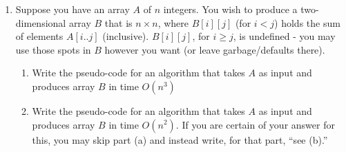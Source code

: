 \documentclass{article}
\begin{document}
\begin{enumerate}[label=\Large\textbf{\arabic*}.]
\begin{enumerate}[label={\arabic*}.]
\end{enumerate}

\item Suppose you have an array $A$ of $n$ integers.  You wish to produce a two-dimensional array $B$ that is $n \times n$, where $B[i][j]$ (for $i < j$) holds the sum of elements $A[i..j]$ (inclusive).  $B[i][j]$, for $i \geq j$, is undefined - you may use those spots in $B$ however you want (or leave garbage/defaults there).
\begin{enumerate}
	\item Write the pseudo-code for an algorithm that takes $A$ as input and produces array $B$ in time $O(n^3)$
	\item Write the pseudo-code for an algorithm that takes $A$ as input and produces array $B$ in time $O(n^2)$.  If you are certain of your answer for this, you may skip part (a) and instead write, for that part, ``see (b).''
	
\end{enumerate}

\end{enumerate}
\end{document}
